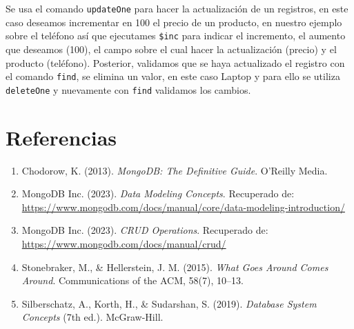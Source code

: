 \documentclass[11pt]{article}
\begin{document}
Se usa el comando \verb'updateOne' para hacer la actualización de un registros, en este caso deseamos incrementar en 100 el precio de un producto, en nuestro ejemplo sobre el teléfono así que ejecutames \verb'$inc' para indicar el incremento, el aumento que deseamos (100), el campo sobre el cual hacer la actualización (precio) y el producto (teléfono). Posterior, validamos que se haya actualizado el registro con el comando \verb'find', se elimina un valor, en este caso Laptop y para ello se utiliza \verb'deleteOne' y nuevamente con \verb'find' validamos los cambios.

\section*{Referencias}

\begin{enumerate}
    \item Chodorow, K. (2013). \textit{MongoDB: The Definitive Guide}. O’Reilly Media. 
    \item MongoDB Inc. (2023). \textit{Data Modeling Concepts}. Recuperado de: \url{https://www.mongodb.com/docs/manual/core/data-modeling-introduction/}
    \item MongoDB Inc. (2023). \textit{CRUD Operations}. Recuperado de: \url{https://www.mongodb.com/docs/manual/crud/}
    \item Stonebraker, M., \& Hellerstein, J. M. (2015). \textit{What Goes Around Comes Around}. Communications of the ACM, 58(7), 10–13. 
    \item Silberschatz, A., Korth, H., \& Sudarshan, S. (2019). \textit{Database System Concepts} (7th ed.). McGraw-Hill.
\end{enumerate}
\end{document}
